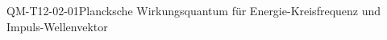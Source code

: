 
\begin{CONC}{QM-T12-02-01}{Plancksche Wirkungsquantum für Energie-Kreisfrequenz und Impuls-Wellenvektor}
\end{CONC}

